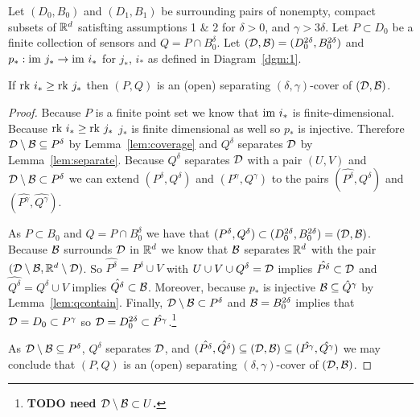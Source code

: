 \begin{theorem}\label{thm:tcc}
  Let $(D_0, B_0)$ and $(D_1, B_1)$ be surrounding pairs of nonempty, compact subsets of $\mathbb{R}^d$ satisfting assumptions 1 \& 2 for $\delta > 0$, and $\gamma > 3\delta$.
  Let $P\subset D_0$ be a finite collection of sensors and $Q = P\cap B_0^\delta$.
  Let $({\mathcal{D}}, {\mathcal{B}}) = (D_0^{2\delta}, B_0^{2\delta})$ and $p_* : \mathrm{im}~j_*\to\mathrm{im}~i_*$ for $j_*$, $i_*$ as defined in Diagram~\ref{dgm:1}.

  If $\mathrm{rk}~i_*\geq \mathrm{rk}~j_*$ then  $(P, Q)$ is an (open) separating $(\delta,\gamma)$-cover of $({\mathcal{D}}, {\mathcal{B}})$.
\end{theorem}
\begin{proof}
  Because $P$ is a finite point set we know that $\mathrm{im}~i_*$ is finite-dimensional.
  Because $\mathrm{rk}~i_*\geq \mathrm{rk}~j_*$ $j_*$ is finite dimensional as well so $p_*$ is injective.
  Therefore ${\mathcal{D}}\setminus{\mathcal{B}}\subseteq P^\delta$ by Lemma~\ref{lem:coverage} and $Q^\delta$ separates ${\mathcal{D}}$ by Lemma~\ref{lem:separate}.
  Because $Q^\delta$ separates ${\mathcal{D}}$ with a pair $(U, V)$ and ${\mathcal{D}}\setminus{\mathcal{B}}\subset P^\delta$ we can extend $(P^\delta, Q^\delta)$ and $(P^\gamma, Q^\gamma)$ to the pairs $(\hat{P^\delta}, \hat{Q^\delta})$ and $(\hat{P^\gamma}, \hat{Q^\gamma})$.

  As $P\subset B_0$ and $Q = P\cap B_0^\delta$ we have that $(P^\delta, Q^\delta) \subset (D_0^{2\delta}, B_0^{2\delta}) = ({\mathcal{D}}, {\mathcal{B}})$.
  Because ${\mathcal{B}}$ surrounds ${\mathcal{D}}$ in $\mathbb{R}^d$ we know that ${\mathcal{B}}$ separates $\mathbb{R}^d$ with the pair $({\mathcal{D}}\setminus{\mathcal{B}}, \mathbb{R}^d\setminus{\mathcal{D}})$.
  So $\hat{P^\delta} = P^\delta\cup V$ with $U\cup V\cup Q^\delta = {\mathcal{D}}$ implies $\hat{P^\delta}\subset {\mathcal{D}}$ and $\hat{Q^\delta} = Q^\delta\cup V$ implies $\hat{Q^\delta}\subset {\mathcal{B}}$.
  Moreover, because $p_*$ is injective ${\mathcal{B}}\subseteq \hat{Q}^\gamma$ by Lemma~\ref{lem:qcontain}.
  Finally, ${\mathcal{D}}\setminus{\mathcal{B}}\subset P^\delta$ and ${\mathcal{B}} = B_0^{2\delta}$ implies that ${\mathcal{D}} = D_0 \subset P^\gamma$ so ${\mathcal{D}} = D_0^{2\delta} \subset \hat{P^\gamma}$.\footnote{\textbf{TODO need ${\mathcal{D}}\setminus{\mathcal{B}}\subset U$.}}

  As ${\mathcal{D}}\setminus {\mathcal{B}} \subseteq P^\delta$, $Q^\delta$ separates ${\mathcal{D}}$, and $(\hat{P^\delta}, \hat{Q^\delta})\subseteq ({\mathcal{D}}, {\mathcal{B}})\subseteq (\hat{P^\gamma}, \hat{Q^\gamma})$ we may conclude that $(P, Q)$ is an (open) separating $(\delta,\gamma)$-cover of $({\mathcal{D}}, {\mathcal{B}})$.
\end{proof}

